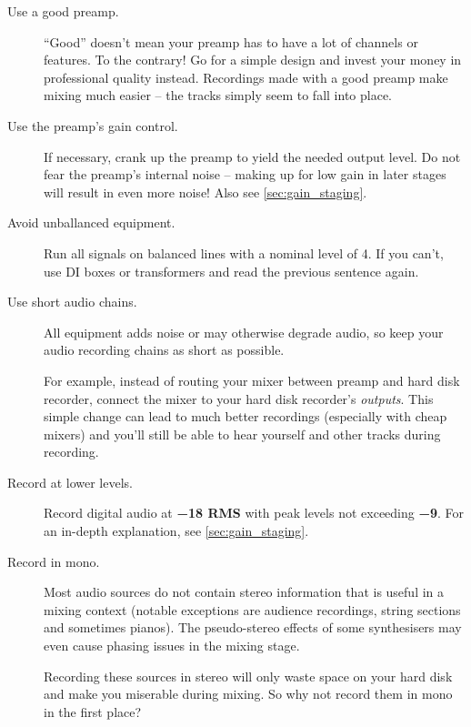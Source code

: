 \begin{description}

\item[Use a good preamp.]  ``Good'' doesn't mean your preamp has to
  have a lot of channels or features.  To the contrary!  Go for a
  simple design and invest your money in professional quality instead.
  Recordings made with a good preamp make mixing much easier -- the
  tracks simply seem to fall into place.

\item[ Use the preamp's gain control.]  If necessary, crank up the
  preamp to yield the needed output level.  Do not fear the preamp's
  internal noise -- making up for low gain in later stages will result
  in even more noise!  Also see \ref{sec:gain_staging}.

\item[Avoid unballanced equipment.]  Run all signals on balanced lines
  with a nominal level of \SI[addsign=all]{+4}{\dBu}.  If you can't,
  use DI boxes or transformers and read the previous sentence again.

\item[Use short audio chains.]  All equipment adds noise or may
  otherwise degrade audio, so keep your audio recording chains as
  short as possible.

  For example, instead of routing your mixer between preamp and hard
  disk recorder, connect the mixer to your hard disk recorder's
  \emph{outputs}.  This simple change can lead to much better
  recordings (especially with cheap mixers) and you'll still be able
  to hear yourself and other tracks during recording.

\item[Record at lower levels.]  Record digital audio at
  \textbf{\SI{-18}{\dBFS} RMS} with peak levels not exceeding
  \textbf{\SI{-9}{\dBFS}}.  For an in-depth explanation, see
  \ref{sec:gain_staging}.

\item[Record in mono.]  Most audio sources do not contain stereo
  information that is useful in a mixing context (notable exceptions
  are audience recordings, string sections and sometimes pianos).  The
  pseudo-stereo effects of some synthesisers may even cause phasing
  issues in the mixing stage.

  Recording these sources in stereo will only waste space on your hard
  disk and make you miserable during mixing.  So why not record them
  in mono in the first place?


\end{description}

